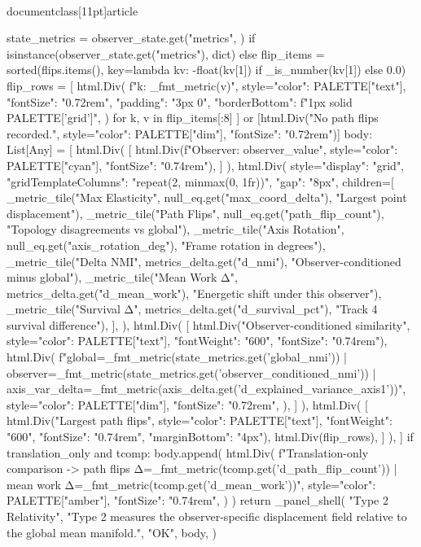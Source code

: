 \\documentclass[11pt]{article}
\begin{document}
\begin{CodeBlock}
{{{{{{{{    state_metrics = observer_state.get("metrics", {}) if isinstance(observer_state.get("metrics"), dict) else {}
    flip_items = sorted(flips.items(), key=lambda kv: -float(kv[1]) if _is_number(kv[1]) else 0.0)
    flip_rows = [
        html.Div(
            f"{k}: {_fmt_metric(v)}",
            style={"color": PALETTE["text"], "fontSize": "0.72rem", "padding": "3px 0", "borderBottom": f"1px solid {PALETTE['grid']}"},
        )
        for k, v in flip_items[:8]
    ] or [html.Div("No path flips recorded.", style={"color": PALETTE["dim"], "fontSize": "0.72rem"})]
    body: List[Any] = [
        html.Div(
            [
                html.Div(f"Observer: {observer_value}", style={"color": PALETTE["cyan"], "fontSize": "0.74rem"}),
            ]
        ),
        html.Div(
            style={"display": "grid", "gridTemplateColumns": "repeat(2, minmax(0, 1fr))", "gap": "8px"},
            children=[
                _metric_tile("Max Elasticity", null_eq.get("max_coord_delta"), "Largest point displacement"),
                _metric_tile("Path Flips", null_eq.get("path_flip_count"), "Topology disagreements vs global"),
                _metric_tile("Axis Rotation", null_eq.get("axis_rotation_deg"), "Frame rotation in degrees"),
                _metric_tile("Delta NMI", metrics_delta.get("d_nmi"), "Observer-conditioned minus global"),
                _metric_tile("Mean Work Δ", metrics_delta.get("d_mean_work"), "Energetic shift under this observer"),
                _metric_tile("Survival Δ", metrics_delta.get("d_survival_pct"), "Track 4 survival difference"),
            ],
        ),
        html.Div(
            [
                html.Div("Observer-conditioned similarity", style={"color": PALETTE["text"], "fontWeight": "600", "fontSize": "0.74rem"}),
                html.Div(
                    f"global={_fmt_metric(state_metrics.get('global_nmi'))} | observer={_fmt_metric(state_metrics.get('observer_conditioned_nmi'))} | axis_var_delta={_fmt_metric(axis_delta.get('d_explained_variance_axis1'))}",
                    style={"color": PALETTE["dim"], "fontSize": "0.72rem"},
                ),
            ]
        ),
        html.Div(
            [
                html.Div("Largest path flips", style={"color": PALETTE["text"], "fontWeight": "600", "fontSize": "0.74rem", "marginBottom": "4px"}),
                html.Div(flip_rows),
            ]
        ),
    ]
    if translation_only and tcomp:
        body.append(
            html.Div(
                f"Translation-only comparison -> path flips Δ={_fmt_metric(tcomp.get('d_path_flip_count'))} | mean work Δ={_fmt_metric(tcomp.get('d_mean_work'))}",
                style={"color": PALETTE["amber"], "fontSize": "0.74rem"},
            )
        )
    return _panel_shell(
        "Type 2 Relativity",
        "Type 2 measures the observer-specific displacement field relative to the global mean manifold.",
        "OK",
        body,
    )


}}}}}}}}
\end{CodeBlock}
\end{document}
